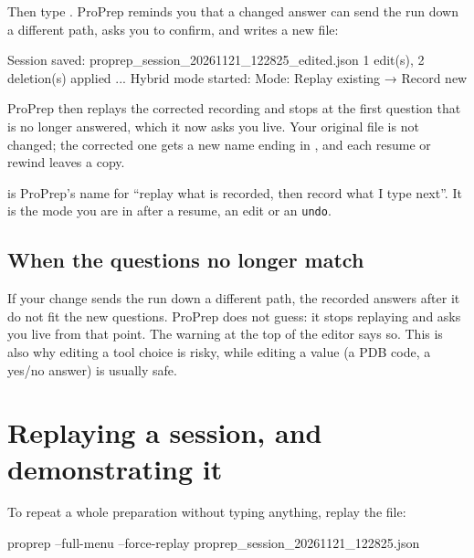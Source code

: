 
Then type . ProPrep reminds you that a changed answer can send the
run down a different path, asks you to confirm, and writes a new file:

\begin{screen}
Session saved: proprep_session_20261121_122825_edited.json
1 edit(s), 2 deletion(s) applied
...
Hybrid mode started:
  Mode: Replay existing → Record new
\end{screen}

ProPrep then replays the corrected recording and stops at the first question
that is no longer answered, which it now asks you live. Your original file is
not changed; the corrected one gets a new name ending in ,
and each resume or rewind leaves a  copy.

\begin{tip}
 is ProPrep's name for ``replay what is recorded, then
record what I type next''. It is the mode you are in after a resume, an edit
or an \texttt{undo}.
\end{tip}

\subsection{When the questions no longer match}

If your change sends the run down a different path, the recorded answers after
it do not fit the new questions. ProPrep does not guess: it stops replaying
and asks you live from that point. The warning at the top of the editor says
so. This is also why editing a tool choice is risky, while editing a value
(a PDB code, a yes/no answer) is usually safe.

\section{Replaying a session, and demonstrating it}
\label{sec:sessions-replay}

To repeat a whole preparation without typing anything, replay the file:

\begin{terminal}
proprep --full-menu --force-replay proprep_session_20261121_122825.json
\end{terminal}

